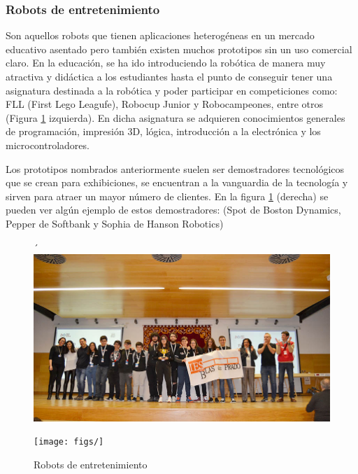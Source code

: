 \subsubsection{Robots de entretenimiento}

Son aquellos robots que tienen aplicaciones heterogéneas en un mercado educativo asentado pero también existen muchos prototipos sin un uso comercial claro. En la educación, se ha ido introduciendo la robótica de manera muy atractiva y didáctica a los estudiantes hasta el punto de conseguir tener una asignatura destinada a la robótica y poder participar en competiciones como: FLL (First Lego Leagufe), Robocup Junior y Robocampeones, entre otros (Figura \ref{fig:robeducativo} izquierda).  En dicha asignatura se adquieren conocimientos generales de programación, impresión 3D, lógica, introducción a la electrónica y los microcontroladores.

Los prototipos nombrados anteriormente suelen ser demostradores tecnológicos que se crean para exhibiciones, se encuentran a la vanguardia de la tecnología y sirven para atraer un mayor número de clientes. En la figura \ref{fig:robeducativo} (derecha) se pueden ver algún ejemplo de estos demostradores: (Spot de Boston Dynamics, Pepper de Softbank y Sophia de Hanson Robotics)  


\begin{figure}[ht!]
	\centering
	
	\begin{minipage}{0.3\linewidth}
		\centering´
		\includegraphics[width=\linewidth]{figs/FLL_TO19.jpg}
		\caption*{\centering Competición FLL ganadores Toledo \footnote{\url{https://www.uclm.es/noticias/febrero2019/toledo/finalfirstlegoleague#}}.}
	\end{minipage}
	\hspace{3cm}
	\begin{minipage}{0.3\linewidth}
		\centering
		\texttt{[image: figs/]}
		\caption*{\centering \cite{}}
	\end{minipage}
	\caption{Robots de entretenimiento}
	\label{fig:robeducativo}
\end{figure}



